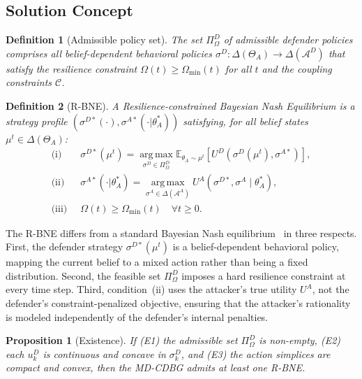\documentclass[conference]{IEEEtran}
\newtheorem{definition}{Definition}
\newtheorem{proposition}{Proposition}
\newcommand{\E}{\mathbb{E}}
\newcommand{\argmax}{\operatorname*{arg\,max}}
\begin{document}
\subsection{Solution Concept}

\begin{definition}[Admissible policy set]
\label{def:admissible}
The set $\Pi^D_\Omega$ of admissible defender policies comprises all
belief-dependent behavioral policies $\sigma^D:\Delta(\Theta_A)\to
\Delta(\mathcal{A}^D)$ that satisfy the resilience constraint
$\Omega(t)\geq\Omega_{\min}(t)$ for all $t$ and the coupling constraints
$\mathcal{C}$.
\end{definition}

\begin{definition}[R-BNE]\label{def:rbne}
A \emph{Resilience-constrained Bayesian Nash Equilibrium} is a strategy profile
$(\sigma^{D*}(\cdot),\sigma^{A*}(\cdot|\theta_A^*))$ satisfying, for all belief
states $\mu^t\in\Delta(\Theta_A)$:
\begin{align}
\text{(i)}\;\; &\sigma^{D*}(\mu^t) = \argmax_{\sigma^D\in\Pi^D_\Omega}
\E_{\theta_A\sim\mu^t}\!\left[U^D(\sigma^D(\mu^t),\sigma^{A*})\right],\\
\text{(ii)}\;\; &\sigma^{A*}(\cdot|\theta_A^*) =
\argmax_{\sigma^A\in\Delta(\mathcal{A}^A)}
U^A(\sigma^{D*},\sigma^A\mid\theta_A^*),\\
\text{(iii)}\;\; &\Omega(t)\geq\Omega_{\min}(t)\quad\forall t\geq 0.
\end{align}
\end{definition}

The R-BNE differs from a standard Bayesian Nash equilibrium~\cite{nash1951} in
three respects.
First, the defender strategy $\sigma^{D*}(\mu^t)$ is a belief-dependent
behavioral policy, mapping the current belief to a mixed action rather than
being a fixed distribution. Second, the feasible set $\Pi^D_\Omega$ imposes a
hard resilience constraint at every time step. Third, condition~(ii) uses
the attacker's true utility $U^A$, not the defender's
constraint-penalized objective, ensuring that the attacker's rationality is
modeled independently of the defender's internal penalties.

\begin{proposition}[Existence]
\label{prop:existence}
If (E1) the admissible set $\Pi^D_\Omega$ is non-empty, (E2) each $u_k^D$ is
continuous and concave in $\sigma_k^D$, and (E3) the action simplices are
compact and convex, then the MD-CDBG admits at least one R-BNE.
\end{proposition}
\end{document}

